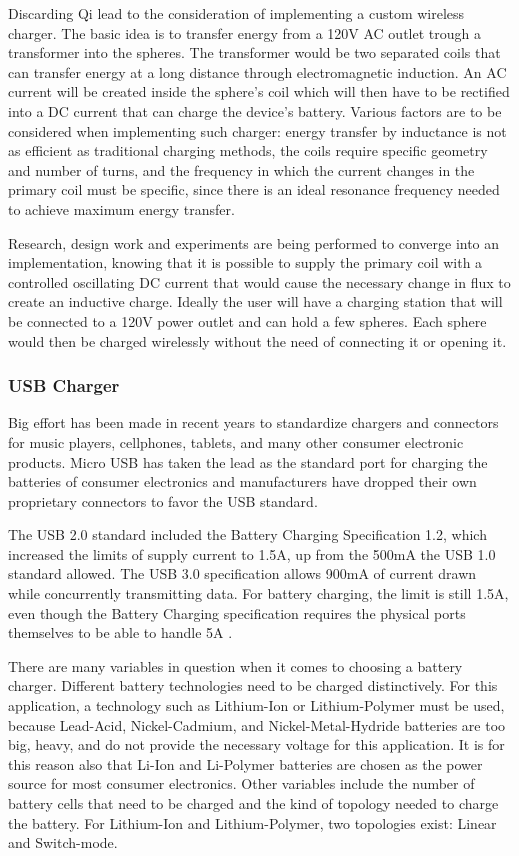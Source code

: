 Discarding Qi lead to the consideration of implementing a custom wireless charger. The basic idea is to transfer energy from a 120V AC outlet trough a transformer into the spheres. The transformer would be two separated coils that can transfer energy at a long distance through electromagnetic induction. An AC current will be created inside the sphere's coil which will then have to be rectified into a DC current that can charge the device's battery. Various factors are to be considered when implementing such charger: energy transfer by inductance is not as efficient as traditional charging methods, the coils require specific geometry and number of turns, and the frequency in which the current changes in the primary coil must be specific, since there is an ideal resonance frequency needed to achieve maximum energy transfer. 

Research, design work and experiments are being performed to converge into an implementation, knowing that it is possible to supply the primary coil with a controlled oscillating DC current that would cause the necessary change in flux to create an inductive charge. Ideally the user will have a charging station that will be connected to a 120V power outlet and can hold a few spheres. Each sphere would then be charged wirelessly without the need of connecting it or opening it.

\subsubsection{USB Charger}
Big effort has been made in recent years to standardize chargers and connectors for music players, cellphones, tablets, and many other consumer electronic products. Micro USB has taken the lead as the standard port for charging the batteries of consumer electronics and manufacturers have dropped their own proprietary connectors to favor the USB standard.

The USB 2.0 standard included the Battery Charging Specification 1.2, which increased the limits of supply current to 1.5A, up from the 500mA the USB 1.0 standard allowed. The USB 3.0 specification allows 900mA of current drawn while concurrently transmitting data. For battery charging, the limit is still 1.5A, even though the Battery Charging specification requires the physical ports themselves to be able to handle 5A \cite{usbSpecs}.

There are many variables in question when it comes to choosing a battery charger. Different battery technologies need to be charged distinctively. For this application, a technology such as Lithium-Ion or Lithium-Polymer must be used, because Lead-Acid, Nickel-Cadmium, and Nickel-Metal-Hydride batteries are too big, heavy, and do not provide the necessary voltage for this application. It is for this reason also that Li-Ion and Li-Polymer batteries are chosen as the power source for most consumer electronics. Other variables include the number of battery cells that need to be charged and the kind of topology needed to charge the battery. For Lithium-Ion and Lithium-Polymer, two topologies exist: Linear and Switch-mode.

